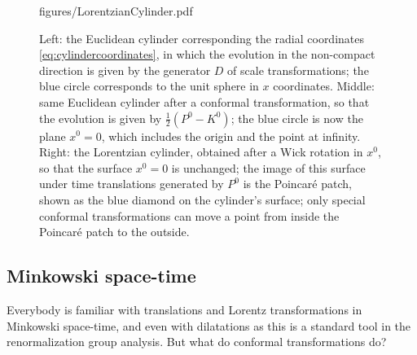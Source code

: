 \documentclass[a4paper,12pt]{article}
\numberwithin{equation}{section}
\begin{document}
\begin{figure}
	{figures/LorentzianCylinder.pdf}
	\caption{Left: the Euclidean cylinder corresponding the radial
	coordinates \eqref{eq:cylindercoordinates}, in which
	the evolution in the non-compact direction is given by
	the generator $D$ of scale transformations;
	the blue circle corresponds to the unit sphere in $x$ coordinates.
	Middle: same Euclidean cylinder after a conformal transformation,
	so that the evolution is given by $\frac{1}{2} (P^0 - K^0)$;
	the blue circle is now the plane $x^0 = 0$, which includes
	the origin and the point at infinity.
	Right: the Lorentzian cylinder, obtained after a Wick rotation
	in $x^0$, so that the surface $x^0 = 0$ is unchanged;
	the image of this surface under time translations 
	generated by $P^0$ is the Poincaré patch, shown as 
	the blue diamond on the cylinder's surface;
	only special conformal transformations can move a point
	from inside the Poincaré patch to the outside.}
	\label{fig:cylinders}
\end{figure}

\subsection{Minkowski space-time}

Everybody is familiar with translations and Lorentz transformations in Minkowski space-time, and even with dilatations as this is a standard tool in the renormalization group analysis. But what do conformal transformations do?
\end{document}

